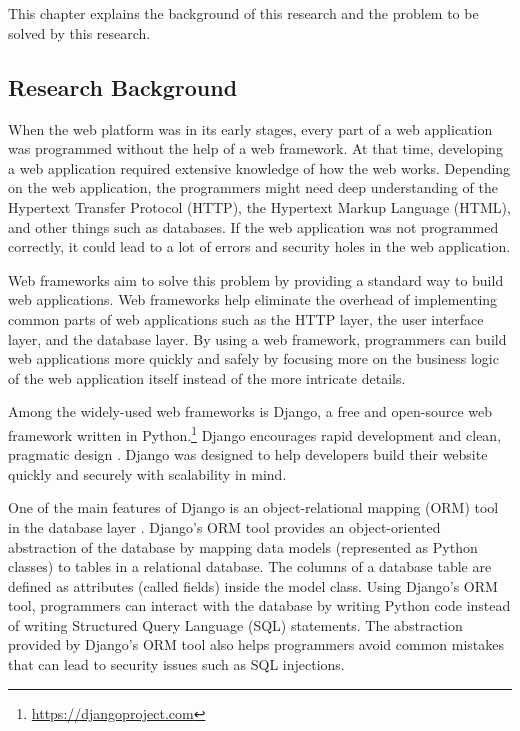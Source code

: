 \chapter{\babSatu}

This chapter explains the background of this research and the problem to be
solved by this research.

\section{Research Background}

When the web platform was in its early stages, every part of a web application
was programmed without the help of a web framework. At that time, developing a
web application required extensive knowledge of how the web works. Depending on
the web application, the programmers might need deep understanding of the
Hypertext Transfer Protocol (HTTP), the Hypertext Markup Language (HTML), and
other things such as databases. If the web application was not programmed
correctly, it could lead to a lot of errors and security holes in the web
application.

Web frameworks aim to solve this problem by providing a standard way to build
web applications. Web frameworks help eliminate the overhead of implementing
common parts of web applications such as the HTTP layer, the user interface
layer, and the database layer. By using a web framework, programmers can build
web applications more quickly and safely by focusing more on the business logic
of the web application itself instead of the more intricate details.

Among the widely-used web frameworks is Django, a free and open-source web
framework written in Python.\footnote{\url{https://djangoproject.com}} Django
encourages rapid development and clean, pragmatic design \cite{django}. Django
was designed to help developers build their website quickly and securely with
scalability in mind.

One of the main features of Django is an object-relational mapping (ORM) tool
in the database layer \cite{django}. Django's ORM tool provides an
object-oriented abstraction of the database by mapping data models (represented
as Python classes) to tables in a relational database. The columns of a
database table are defined as attributes (called fields) inside the model
class. Using Django's ORM tool, programmers can interact with the database by
writing Python code instead of writing Structured Query Language (SQL)
statements. The abstraction provided by Django's ORM tool also helps
programmers avoid common mistakes that can lead to security issues such as SQL
injections.

